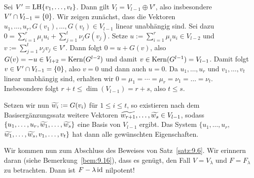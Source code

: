 \begin{beweis}
	Sei $V' = \operatorname{LH}\{v_1,\dots,v_t\}$.
	Dann gilt $V_l = V_{l-1} \oplus V'$, also insbesondere $V' \cap V_{l-1} = \{0\}$.
	Wir zeigen zunächst, dass die Vektoren $u_1,\dots,u_r,G(v_1),\dots,G(v_t) \in V_{l-1}$ linear unabhängig sind.
	Sei dazu $0 = \sum_{i=1}^{r} \mu_i u_i + \sum_{j=1}^{t} \nu_j G(v_j)$.
	Setze $u := \sum_{i=1}^{r} \mu_i u_i \in V_{l-2}$ und $v := \sum_{j=1}^{t} \nu_j v_j \in V'$.
	Dann folgt $0 = u+ G(v)$, also $G(v) = -u \in V_{l+2} = \operatorname{Kern}(G^{l-2})$ und damit $v \in \operatorname{Kern}(G^{l-1}) = V_{l-1}$.
	Damit folgt $v \in V' \cap V_{l-1} = \{0\}$, also $v = 0$ und dann auch $u = 0$.
	Da $u_1,\dots,u_r$ und $v_1,\dots,v_t$ linear unabhängig sind, erhalten wir $0 = \mu_1 = \cdots = \mu_r = \nu_1 = \dots = \nu_t$.
	Insbesondere folgt $r+t \leq \dim(V_{l-1}) = r+s$, also $t \leq s$.
	
	Setzen wir nun $\widetilde{w_i} := G(v_i)$ für $1 \leq i \leq t$, so existieren nach dem Basisergänzungssatz weitere Vektoren $\widetilde{w_{r+1}},\dots,\widetilde{w_s} \in V_{l-1}$, sodass $\{u_1,\dots,u_r,\widetilde{w_1},\dots,\widetilde{w_s}\}$ eine Basis von $V_{l-1}$ ergibt.
	Das System $\{u_1,\dots,u_r,$ \linebreak $\widetilde{w_1},\dots,\widetilde{w_s},v_1,\dots,v_t\}$ hat dann alle gewünschten Eigenschaften. 
\end{beweis}

Wir kommen nun zum Abschluss des Beweises von Satz~\ref{satz:9.6}.
Wir erinnern daran (siehe Bemerkung~\ref{bem:9.16}), dass es genügt, den Fall $V = V_\lambda$ und $F = F_\lambda$ zu betrachten.
Dann ist $F- \lambda \operatorname{id}$ nilpotent!

